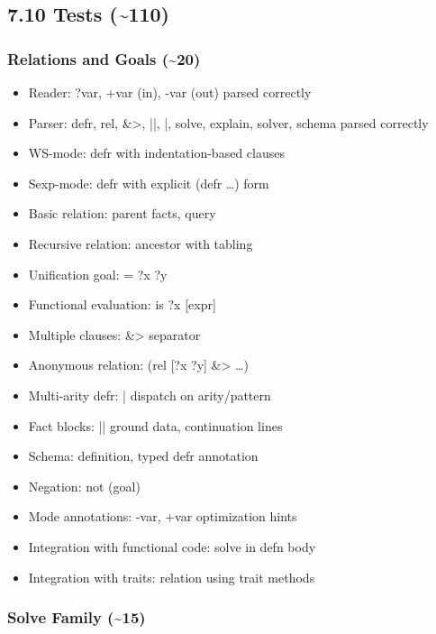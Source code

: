 \documentclass[11pt]{article}
\begin{document}
\subsection{7.10 Tests (\textasciitilde{}110)}
\label{sec:org09ce696}

\subsubsection{Relations and Goals (\textasciitilde{}20)}
\label{sec:orgbf9af95}

\begin{itemize}
\item Reader: ?var, +var (in), -var (out) parsed correctly
\item Parser: defr, rel, \&>, ||, |, solve, explain, solver, schema parsed correctly
\item WS-mode: defr with indentation-based clauses
\item Sexp-mode: defr with explicit (defr \ldots{}) form
\item Basic relation: parent facts, query
\item Recursive relation: ancestor with tabling
\item Unification goal: = ?x ?y
\item Functional evaluation: is ?x [expr]
\item Multiple clauses: \&> separator
\item Anonymous relation: (rel [?x ?y] \&> \ldots{})
\item Multi-arity defr: | dispatch on arity/pattern
\item Fact blocks: || ground data, continuation lines
\item Schema: definition, typed defr annotation
\item Negation: not (goal)
\item Mode annotations: -var, +var optimization hints
\item Integration with functional code: solve in defn body
\item Integration with traits: relation using trait methods
\end{itemize}
\subsubsection{Solve Family (\textasciitilde{}15)}
\label{sec:orge847108}
\end{document}
